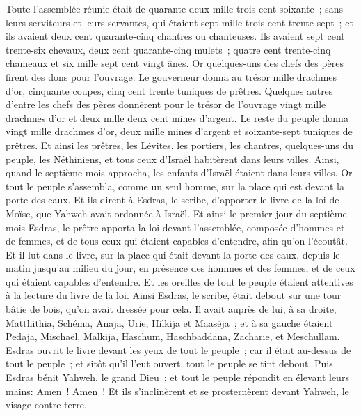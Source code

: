 \begin{multicols}{2}
Toute l'assemblée réunie était de quarante-deux mille trois cent soixante~;
sans leurs serviteurs et leurs servantes, qui étaient sept mille trois cent trente-sept~; et ils avaient deux cent quarante-cinq chantres ou chanteuses.
Ils avaient sept cent trente-six chevaux, deux cent quarante-cinq mulets~;
quatre cent trente-cinq chameaux et six mille sept cent vingt ânes.
Or quelques-uns des chefs des pères firent des dons pour l'ouvrage. Le gouverneur donna au trésor mille drachmes d'or, cinquante coupes, cinq cent trente tuniques de prêtres.
Quelques autres d'entre les chefs des pères donnèrent pour le trésor de l'ouvrage vingt mille drachmes d'or et deux mille deux cent mines d'argent.
Le reste du peuple donna vingt mille drachmes d'or, deux mille mines d'argent et soixante-sept tuniques de prêtres.
Et ainsi les prêtres, les Lévites, les portiers, les chantres, quelques-uns du peuple, les Néthiniens, et tous ceux d'Israël habitèrent dans leurs villes. Ainsi, quand le septième mois approcha, les enfants d'Israël étaient dans leurs villes.
\VerseOne{}Or tout le peuple s'assembla, comme un seul homme, sur la place qui est devant la porte des eaux. Et ils dirent à Esdras, le scribe, d'apporter le livre de la loi de Moïse, que Yahweh avait ordonnée à Israël.
Et ainsi le premier jour du septième mois Esdras, le prêtre apporta la loi devant l'assemblée, composée d'hommes et de femmes, et de tous ceux qui étaient capables d'entendre, afin qu'on l'écoutât.
Et il lut dans le livre, sur la place qui était devant la porte des eaux, depuis le matin jusqu'au milieu du jour, en présence des hommes et des femmes, et de ceux qui étaient capables d'entendre. Et les oreilles de tout le peuple étaient attentives à la lecture du livre de la loi.
Ainsi Esdras, le scribe, était debout sur une tour bâtie de bois, qu'on avait dressée pour cela. Il avait auprès de lui, à sa droite, Matthithia, Schéma, Anaja, Urie, Hilkija et Maaséja~; et à sa gauche étaient Pedaja, Mischaël, Malkija, Haschum, Haschbaddana, Zacharie, et Meschullam.
Esdras ouvrit le livre devant les yeux de tout le peuple~; car il était au-dessus de tout le peuple~; et sitôt qu'il l'eut ouvert, tout le peuple se tint debout.
Puis Esdras bénit Yahweh, le grand Dieu~; et tout le peuple répondit en élevant leurs mains: Amen~! Amen~! Et ils s'inclinèrent et se prosternèrent devant Yahweh, le visage contre terre.

\end{multicols}
